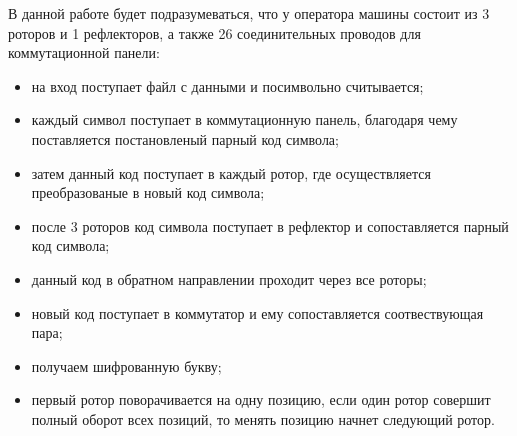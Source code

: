 В данной работе будет подразумеваться, что у оператора машины состоит из 3 роторов и 1 рефлекторов, а также 26 соединительных проводов для коммутационной панели:
\begin{itemize}
	\item на вход поступает файл с данными и посимвольно считывается;
	\item каждый символ поступает в коммутационную панель, благодаря чему поставляется постановленый парный код символа;
	\item затем данный код поступает в каждый ротор, где осуществляется преобразованые в новый код символа;
	\item после 3 роторов код символа поступает в рефлектор и сопоставляется парный код символа;
	\item данный код в обратном направлении проходит через все роторы;
	\item новый код поступает в коммутатор и ему сопоставляется соотвествующая пара;
	\item получаем шифрованную букву;
	\item первый ротор поворачивается на одну позицию, если один ротор совершит полный оборот всех позиций, то менять позицию начнет следующий ротор. 
\end{itemize}